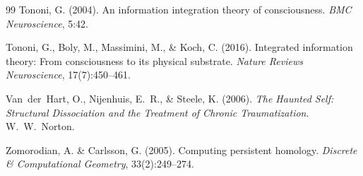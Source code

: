 \documentclass[11pt,a4paper]{article}
\begin{document}
\begin{thebibliography}{99}
Tononi, G. (2004).
\newblock An information integration theory of consciousness.
\newblock \emph{BMC Neuroscience}, 5:42.

Tononi, G., Boly, M., Massimini, M., \& Koch, C. (2016).
\newblock Integrated information theory: From consciousness to its physical substrate.
\newblock \emph{Nature Reviews Neuroscience}, 17(7):450--461.

Van~der~Hart, O., Nijenhuis, E.~R., \& Steele, K. (2006).
\newblock \emph{The Haunted Self: Structural Dissociation and the Treatment of Chronic Traumatization}.
\newblock W.~W.~Norton.

Zomorodian, A. \& Carlsson, G. (2005).
\newblock Computing persistent homology.
\newblock \emph{Discrete \& Computational Geometry}, 33(2):249--274.

\end{thebibliography}
\end{document}
